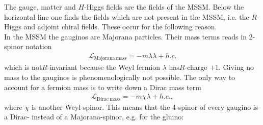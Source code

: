 The gauge, matter and $H$-Higgs fields are the fields of the MSSM. Below the horizontal line one finds the fields which are not present in the MSSM, i.e. the $R$-Higgs and adjoint chiral fields. These occur for the following reason.\\
In the MSSM the gauginos are Majorana particles. Their mass terms  reads in 2-spinor notation
\begin{align}
\mathcal{L}_{\mathrm{Majorana\ mass}} = -m\lambda\lambda + h.c.
\end{align}
which is not$R$-invariant because the Weyl fermion $\lambda$ has$R$-charge $+1$. Giving no mass to the gauginos is phenomenologically not possible. The only way to account for a fermion mass is to write down a Dirac mass term
\begin{align}
\mathcal{L}_{\mathrm{Dirac\ mass}} = -m \chi\lambda + h.c.,
\end{align}
where $\chi$ is another Weyl-spinor. This means that the 4-spinor of every gaugino is a Dirac- instead of a Majorana-spinor, e.g. for the gluino:

